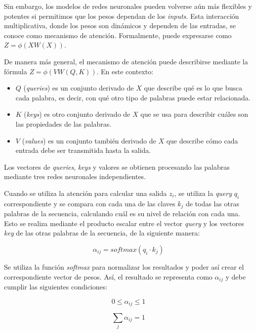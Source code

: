 \documentclass[11pt,spanish,listoffigures,listoftables]{tfgetsinf}
\begin{document}
Sin embargo, los modelos de redes neuronales pueden volverse aún más flexibles y potentes si permitimos que los pesos dependan de los \textit{inputs}. Esta interacción multiplicativa, donde los pesos son dinámicos y dependen de las entradas, se conoce como mecanismo de atención. Formalmente, puede expresarse como $Z = \phi(XW(X))$.

De manera más general, el mecanismo de atención puede describirse mediante la fórmula $Z = \phi(VW(Q, K))$. En este contexto:

\begin{itemize}
\item $Q$ (\textit{queries}) es un conjunto derivado de $X$ que describe qué es lo que busca cada palabra, es decir, con qué otro tipo de palabras puede estar relacionada.
\item $K$ (\textit{keys}) es otro conjunto derivado de $X$ que se usa para describir cuáles son las propiedades de las palabras.
\item $V$ (\textit{values}) es un conjunto también derivado de $X$ que describe cómo cada entrada debe ser transmitida hasta la salida.
\end{itemize}

Los vectores de \textit{queries}, \textit{keys} y valores se obtienen procesando las palabras mediante tres redes neuronales independientes.

Cuando se utiliza la atención para calcular una salida $z_i$, se utiliza la \textit{query} $q_i$ correspondiente  y se compara con cada una de las claves $k_j$ de todas las otras palabras de la secuencia, calculando cuál es su nivel de relación con cada una. Esto se realiza mediante el producto escalar entre el vector \textit{query} y los vectores \textit{key} de las otras palabras de la secuencia, de la siguiente manera:

\begin{equation}
\alpha_{ij} = softmax(q_i \cdot k_j)
\end{equation}

Se utiliza la función \textit{softmax} para normalizar los resultados y poder así crear el correspondiente vector de pesos. Así, el resultado se representa como $\alpha_{ij}$ y debe cumplir las siguientes condiciones:

\begin{equation}
0 \le \alpha_{ij} \le 1
\end{equation}

\begin{equation}
\sum_j\alpha_{ij} = 1
\end{equation}
\end{document}
